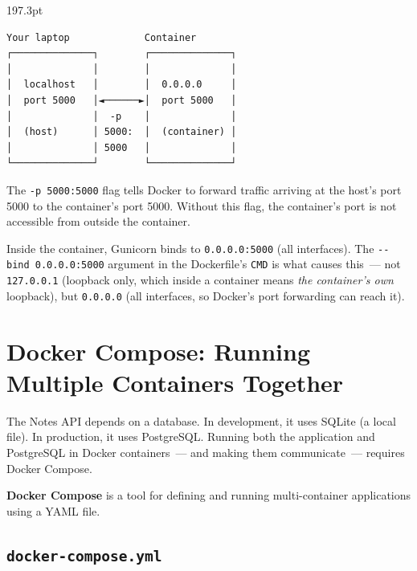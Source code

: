 \begin{diagrambox}[short]{197.3pt}
\begin{Verbatim}[fontsize=\fontsize{9.0}{8.55}\selectfont]
Your laptop             Container
┌──────────────┐        ┌──────────────┐
│              │        │              │
│  localhost   │        │  0.0.0.0     │
│  port 5000   │◄──────►│  port 5000   │
│              │  -p    │              │
│  (host)      │ 5000:  │  (container) │
│              │ 5000   │              │
└──────────────┘        └──────────────┘
\end{Verbatim}
\end{diagrambox}

\noindent{}The \texttt{-p\ 5000:5000} flag tells Docker to forward traffic arriving at the host's port 5000 to the container's port 5000. Without this flag, the container's port is not accessible from outside the container.

Inside the container, Gunicorn binds to \texttt{0.0.0.0:5000} (all interfaces). The \texttt{-\/-bind\ 0.0.0.0:5000} argument in the Dockerfile's \texttt{CMD} is what causes this~--- not \texttt{127.0.0.1} (loopback only, which inside a container means \emph{the container's own} loopback), but \texttt{0.0.0.0} (all interfaces, so Docker's port forwarding can reach it).

\setcounter{section}{5}
\section{Docker Compose: Running Multiple Containers Together}\label{18-containerization:186-docker-compose-running-multiple-containers-together}

The Notes API depends on a database. In development, it uses SQLite (a local file). In production, it uses PostgreSQL. Running both the application and PostgreSQL in Docker containers~--- and making them communicate~--- requires Docker Compose.

\textbf{Docker Compose} is a tool for defining and running multi-container applications using a YAML file.

\subsection*{\texorpdfstring{\texttt{docker-compose.yml}}{docker-compose.yml}}\label{18-containerization:docker-composeyml}

